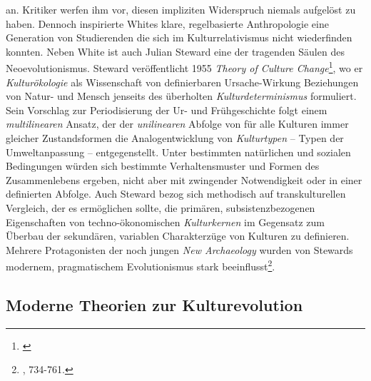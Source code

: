 \documentclass[openany,twoside,twocolumn]{book}
\let\rmarkdownfootnote\footnote%
\def\footnote{\protect\rmarkdownfootnote}
\begin{document}
an. Kritiker werfen ihm vor, diesen impliziten Widerspruch niemals aufgelöst zu haben. Dennoch inspirierte Whites klare, regelbasierte Anthropologie eine Generation von Studierenden die sich im Kulturrelativismus nicht wiederfinden konnten. Neben White ist auch Julian Steward eine der tragenden Säulen des Neoevolutionismus. Steward veröffentlicht 1955 \emph{Theory of Culture Change}\footnote{\textcite{steward_theory_1955}}, wo er \emph{Kulturökologie} als Wissenschaft von definierbaren Ursache-Wirkung Beziehungen von Natur- und Mensch jenseits des überholten \emph{Kulturdeterminismus} formuliert. Sein Vorschlag zur Periodisierung der Ur- und Frühgeschichte folgt einem \emph{multilinearen} Ansatz, der der \emph{unilinearen} Abfolge von für alle Kulturen immer gleicher Zustandsformen die Analogentwicklung von \emph{Kulturtypen} -- Typen der Umweltanpassung -- entgegenstellt. Unter bestimmten natürlichen und sozialen Bedingungen würden sich bestimmte Verhaltensmuster und Formen des Zusammenlebens ergeben, nicht aber mit zwingender Notwendigkeit oder in einer definierten Abfolge. Auch Steward bezog sich methodisch auf transkulturellen Vergleich, der es ermöglichen sollte, die primären, subsistenzbezogenen Eigenschaften von techno-ökonomischen \emph{Kulturkernen} im Gegensatz zum Überbau der sekundären, variablen Charakterzüge von Kulturen zu definieren. Mehrere Protagonisten der noch jungen \emph{New Archaeology} wurden von Stewards modernem, pragmatischem Evolutionismus stark beeinflusst\footnote{\textcite{petermann_geschichte_2004}, 734-761.}.

\hypertarget{evolutionism-modern-theories}{%
\subsection{Moderne Theorien zur Kulturevolution}\label{evolutionism-modern-theories}}
\end{document}
